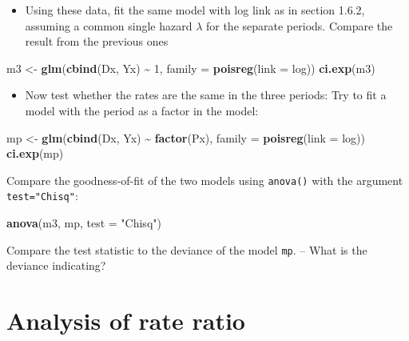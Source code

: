 \documentclass[
]{book}
\newenvironment{Shaded}{\begin{snugshade}}{\end{snugshade}}
\newcommand{\AttributeTok}[1]{\textcolor[rgb]{0.13,0.29,0.53}{#1}}
\newcommand{\DecValTok}[1]{\textcolor[rgb]{0.00,0.00,0.81}{#1}}
\newcommand{\FunctionTok}[1]{\textcolor[rgb]{0.13,0.29,0.53}{\textbf{#1}}}
\newcommand{\NormalTok}[1]{#1}
\newcommand{\OtherTok}[1]{\textcolor[rgb]{0.56,0.35,0.01}{#1}}
\newcommand{\SpecialCharTok}[1]{\textcolor[rgb]{0.81,0.36,0.00}{\textbf{#1}}}
\newcommand{\StringTok}[1]{\textcolor[rgb]{0.31,0.60,0.02}{#1}}
\providecommand{\tightlist}{%
  \setlength{\itemsep}{0pt}\setlength{\parskip}{0pt}}
\begin{document}
\begin{itemize}
\tightlist
\item
  Using these data,
  fit the same model with log link as in section 1.6.2, assuming a common single hazard \(\lambda\)
  for the separate periods. Compare the result from the previous ones
\end{itemize}

\begin{Shaded}
\begin{Highlighting}[]
\NormalTok{m3 }\OtherTok{\textless{}{-}} \FunctionTok{glm}\NormalTok{(}\FunctionTok{cbind}\NormalTok{(Dx, Yx) }\SpecialCharTok{\textasciitilde{}} \DecValTok{1}\NormalTok{, }\AttributeTok{family =} \FunctionTok{poisreg}\NormalTok{(}\AttributeTok{link =}\NormalTok{ log))}
\FunctionTok{ci.exp}\NormalTok{(m3)}
\end{Highlighting}
\end{Shaded}

\begin{itemize}
\tightlist
\item
  Now test whether the rates are the same in the three periods:
  Try to fit a model with the period as a factor in the model:
\end{itemize}

\begin{Shaded}
\begin{Highlighting}[]
\NormalTok{mp }\OtherTok{\textless{}{-}} \FunctionTok{glm}\NormalTok{(}\FunctionTok{cbind}\NormalTok{(Dx, Yx) }\SpecialCharTok{\textasciitilde{}} \FunctionTok{factor}\NormalTok{(Px), }\AttributeTok{family =} \FunctionTok{poisreg}\NormalTok{(}\AttributeTok{link =}\NormalTok{ log))}
\FunctionTok{ci.exp}\NormalTok{(mp)}
\end{Highlighting}
\end{Shaded}

Compare the goodness-of-fit of the two models using \texttt{anova()} with the argument
\texttt{test="Chisq"}:

\begin{Shaded}
\begin{Highlighting}[]
\FunctionTok{anova}\NormalTok{(m3, mp, }\AttributeTok{test =} \StringTok{"Chisq"}\NormalTok{)}
\end{Highlighting}
\end{Shaded}

Compare the test statistic to the deviance of the model \texttt{mp}.
-- What is the deviance indicating?

\section{Analysis of rate ratio}\label{analysis-of-rate-ratio}
\end{document}
